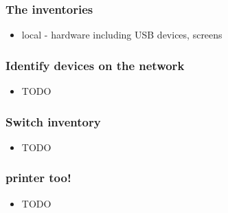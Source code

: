 \begin{frame}
    \frametitle{The inventories}

    \begin{itemize}
        \item local - hardware including USB devices, screens
    \end{itemize}
\end{frame}


\begin{frame}
    \frametitle{Identify devices on the network}

    \begin{itemize}
        \item TODO
    \end{itemize}
\end{frame}

\begin{frame}
    \frametitle{Switch inventory}

    \begin{itemize}
        \item TODO
    \end{itemize}
\end{frame}


\begin{frame}
    \frametitle{printer too!}

    \begin{itemize}
        \item TODO
    \end{itemize}
\end{frame}

